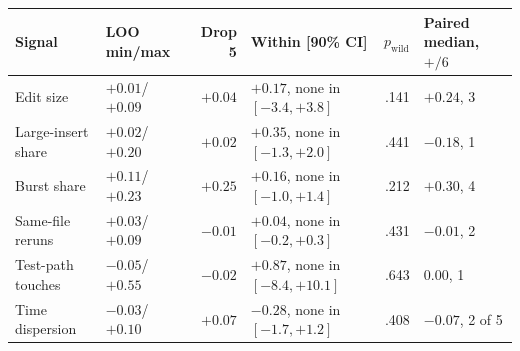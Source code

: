 \begin{table}[!htbp]
\begin{tabular}{@{}l l r l r l@{}}
\toprule
Signal & LOO min/max & Drop 5 & Within [90\% CI] & $p_{\text{wild}}$ & Paired median, $+/6$ \\
\midrule
Edit size & $+0.01$/$+0.09$ & $+0.04$ & $+0.17$, none in $[-3.4, +3.8]$ & .141 & $+0.24$, 3 \\
Large-insert share & $+0.02$/$+0.20$ & $+0.02$ & $+0.35$, none in $[-1.3, +2.0]$ & .441 & $-0.18$, 1 \\
Burst share & $+0.11$/$+0.23$ & $+0.25$ & $+0.16$, none in $[-1.0, +1.4]$ & .212 & $+0.30$, 4 \\
Same-file reruns & $+0.03$/$+0.09$ & $-0.01$ & $+0.04$, none in $[-0.2, +0.3]$ & .431 & $-0.01$, 2 \\
Test-path touches & $-0.05$/$+0.55$ & $-0.02$ & $+0.87$, none in $[-8.4, +10.1]$ & .643 & $0.00$, 1 \\
Time dispersion & $-0.03$/$+0.10$ & $+0.07$ & $-0.28$, none in $[-1.7, +1.2]$ & .408 & $-0.07$, 2 of 5 \\
\bottomrule
\end{tabular}
\end{table}
